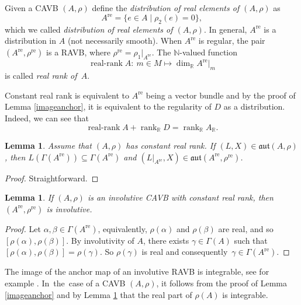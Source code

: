 \documentclass[11pt]{article}
\numberwithin{equation}{section}
\numberwithin{equation}{section}
\newtheorem{Lemma}[Theorem]{Lemma}
\newcommand{\R}{{\mathbb{R}}}
\newcommand{\aut}{\mathfrak{aut}}
\DeclareMathOperator{\rk}{rank}
\DeclareMathOperator{\real}{re}
\begin{document}
\begin{Definition}
Given a CAVB $(A,\rho)$ define the {\em distribution of real elements of $(A,\rho)$} as
\[A^{\real} =\{e\in A\mid \rho_2(e)=0\},\]
which we called {\em distribution of real elements of $(A,\rho)$}. In general, $A^{\real}$ is a distribution in $A$ (not necessarily smooth). When $A^{\real}$ is regular, the pair $(A^{\real},\rho^{\real})$ is a RAVB, where $\rho^{\real}=\rho_1|_{A^{\real}}$. The $\mathbb{N}$-valued function %
\[\operatorname{\text{real-rank}} A\colon \ m\in M\mapsto \dim_{\R} A^{\real}|_m\]
is called {\em real rank of~$A$}.
\end{Definition}
Constant real rank is equivalent to $A^{\real}$ being a vector bundle and by the proof of Lemma \ref{imageanchor}, it is equivalent to the regularity of $D$ as a distribution. Indeed, we can see that
\begin{equation}\label{sum_identity}
  {\operatorname{\text{real-rank}} A}+\rk_{\R} D=\rk_{\R} A_{\R}.
\end{equation}
\begin{Lemma}\label{restriction_inf_aut}
   Assume that $(A,\rho)$ has constant real rank. If $(L,X)\in \aut(A,\rho)$, then $L(\Gamma(A^{\real}))\subseteq\Gamma(A^{\real})$ and $(L|_{A^{\real}}, X)\in \aut(A^{\real},\rho^{\real})$.
\end{Lemma}
\begin{proof}
  Straightforward.
\end{proof}

 \begin{Lemma}\label{cavb_inv}
 If $(A,\rho)$ is an involutive CAVB with constant real rank, then $(A^{\real}, \rho^{\real})$ is involutive.
 \end{Lemma}
\begin{proof}
Let $\alpha, \beta \in \Gamma (A^{\real})$, equivalently, $\rho (\alpha)$ and $\rho (\beta)$ are real, and so $[\rho (\alpha), \rho (\beta)]$. By involutivity of $A$, there exists $\gamma \in \Gamma (A)$ such that $[\rho (\alpha), \rho (\beta)]=\rho (\gamma)$. So $\rho (\gamma)$ is real and consequently~${\gamma\in \Gamma(A^{\real})}$.
\end{proof}


The image of the anchor map of an involutive RAVB is integrable, see for example \cite{bursztyn2019splitting}. In~the~case of a CAVB $(A,\rho)$, it follows from the proof of Lemma \ref{imageanchor} and by Lemma \ref{cavb_inv} that the real part of $\rho(A)$ is integrable.
\end{document}
